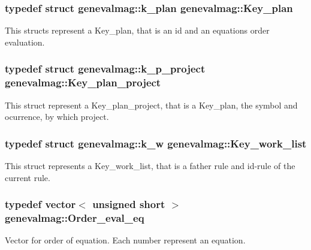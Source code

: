 \hypertarget{namespacegenevalmag_a9cb3d5a3c6e368bf7a12efbc09f71048}{
\subsubsection[{Key\_\-plan}]{\setlength{\rightskip}{0pt plus 5cm}typedef struct {\bf genevalmag::k\_\-plan}  {\bf genevalmag::Key\_\-plan}}}
\label{namespacegenevalmag_a9cb3d5a3c6e368bf7a12efbc09f71048}
This structs represent a Key\_\-plan, that is an id and an equations order evaluation. \hypertarget{namespacegenevalmag_ace502fedfb5a14e31d5d20b0d35b807d}{
\subsubsection[{Key\_\-plan\_\-project}]{\setlength{\rightskip}{0pt plus 5cm}typedef struct {\bf genevalmag::k\_\-p\_\-project}  {\bf genevalmag::Key\_\-plan\_\-project}}}
\label{namespacegenevalmag_ace502fedfb5a14e31d5d20b0d35b807d}
This struct represent a Key\_\-plan\_\-project, that is a Key\_\-plan, the symbol and ocurrence, by which project. \hypertarget{namespacegenevalmag_a457ae083d404303792f6086cf82a1c59}{
\subsubsection[{Key\_\-work\_\-list}]{\setlength{\rightskip}{0pt plus 5cm}typedef struct {\bf genevalmag::k\_\-w}  {\bf genevalmag::Key\_\-work\_\-list}}}
\label{namespacegenevalmag_a457ae083d404303792f6086cf82a1c59}
This struct represents a Key\_\-work\_\-list, that is a father rule and id-\/rule of the current rule. \hypertarget{namespacegenevalmag_a0bb2e8b0fa1b07b873f0363719de7b64}{
\subsubsection[{Order\_\-eval\_\-eq}]{\setlength{\rightskip}{0pt plus 5cm}typedef vector$<$ unsigned short $>$ {\bf genevalmag::Order\_\-eval\_\-eq}}}
\label{namespacegenevalmag_a0bb2e8b0fa1b07b873f0363719de7b64}
Vector for order of equation. Each number represent an equation. 

